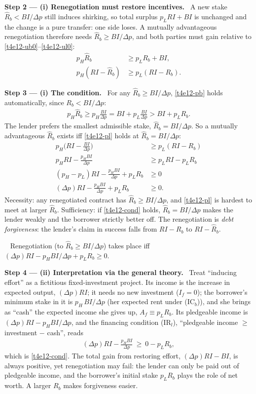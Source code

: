 \documentclass[11pt,a4paper]{article}
\newcommand{\step}[2]{\par\medskip\noindent\textbf{Step #1 --- #2.}~}
\newcommand{\answer}[1]{\par\smallskip\noindent\fbox{\textbf{Answer #1.}}~}
\begin{document}
\step{2}{(i) Renegotiation must restore incentives} A new stake $\hat R_b<BI/\Delta p$ still induces
shirking, so total surplus $p_LRI+BI$ is unchanged and the change is a pure transfer: one side loses.
A mutually advantageous renegotiation therefore needs $\hat R_b\ge BI/\Delta p$, and both parties must
gain relative to \eqref{t4e12-ub0}--\eqref{t4e12-ul0}:
\begin{align}
  p_H\hat R_b &\ge p_LR_b+BI, \label{t4e12-pb}\\
  p_H(RI-\hat R_b) &\ge p_L(RI-R_b). \label{t4e12-pl}
\end{align}

\step{3}{(i) The condition} For any $\hat R_b\ge BI/\Delta p$, \eqref{t4e12-pb} holds automatically, since
$R_b<BI/\Delta p$:
\begin{align}
  p_H\hat R_b \ge p_H\frac{BI}{\Delta p}=BI+p_L\frac{BI}{\Delta p} > BI+p_LR_b. \nonumber
\end{align}
The lender prefers the smallest admissible stake, $\hat R_b=BI/\Delta p$. So a mutually advantageous
$\hat R_b$ exists iff \eqref{t4e12-pl} holds at $\hat R_b=BI/\Delta p$:
\begin{align}
  p_H\Big(RI-\frac{BI}{\Delta p}\Big) &\ge p_L(RI-R_b) \nonumber\\
  p_HRI-\frac{p_HBI}{\Delta p} &\ge p_LRI-p_LR_b \nonumber\\
  (p_H-p_L)RI-\frac{p_HBI}{\Delta p}+p_LR_b &\ge 0 \nonumber\\
  (\Delta p)RI-\frac{p_HBI}{\Delta p}+p_LR_b &\ge 0. \label{t4e12-cond}
\end{align}
Necessity: any renegotiated contract has $\hat R_b\ge BI/\Delta p$, and \eqref{t4e12-pl} is hardest to
meet at larger $\hat R_b$. Sufficiency: if \eqref{t4e12-cond} holds, $\hat R_b=BI/\Delta p$ makes the
lender weakly and the borrower strictly better off. The renegotiation is \emph{debt forgiveness}: the
lender's claim in success falls from $RI-R_b$ to $RI-\hat R_b$.

\answer{(i)} Renegotiation (to $\hat R_b\ge BI/\Delta p$) takes place iff
$(\Delta p)RI-p_HBI/\Delta p+p_LR_b\ge0$.

\step{4}{(ii) Interpretation via the general theory} Treat ``inducing effort'' as a fictitious
fixed-investment project. Its income is the increase in expected output, $(\Delta p)RI$; it needs no
new investment ($I_f=0$); the borrower's minimum stake in it is $p_H\,BI/\Delta p$ (her expected rent
under (IC$_b$)), and she brings as ``cash'' the expected income she gives up, $A_f\equiv p_LR_b$. Its
pledgeable income is $(\Delta p)RI-p_HBI/\Delta p$, and the financing condition (IR$_l$),
``pledgeable income $\ge$ investment $-$ cash'', reads
\begin{align}
  (\Delta p)RI-\frac{p_HBI}{\Delta p} \ \ge\ 0-p_LR_b, \label{t4e12-fict}
\end{align}
which is \eqref{t4e12-cond}. The total gain from restoring effort, $(\Delta p)RI-BI$, is always positive,
yet renegotiation may fail: the lender can only be paid out of pledgeable income, and the borrower's
initial stake $p_LR_b$ plays the role of net worth. A larger $R_b$ makes forgiveness easier.
\end{document}
